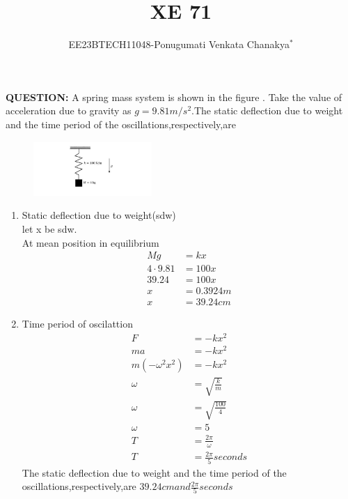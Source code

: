 \documentclass[journal,12pt,twocolumn]{IEEEtran}
\theoremstyle{remark}
\begin{document}
 
 \vspace{3cm}
 \title{\textbf{XE 71}}
 \author{EE23BTECH11048-Ponugumati Venkata Chanakya$^{*}$%
 }
 \maketitle
 \newpage
 \bigskip
 \renewcommand{\thefigure}{\theenumi}
 \renewcommand{\thetable}{\theenumi}
 \textbf{QUESTION:}
 A spring mass system is shown in the figure . Take the value of acceleration  due to gravity as $g=9.81m/s^2$.The static deflection due to weight and the time period of the oscillations,respectively,are\\
 \begin{figure}[h!]
    \centering
    \includegraphics[width=0.4\textwidth]{figs/fig1.jpg}
    \caption{ }
    \label{fig}
\end{figure}

\solution
\begin{enumerate}
    \item Static deflection due to weight(sdw)\\
    let x be sdw.\\
    At mean position in equilibrium\\
    \begin{align}
        Mg&=kx\\
        4\cdot9.81&=100x\\
        39.24&=100x\\
        x&=0.3924m\\
        x&=39.24cm
    \end{align}
     \item Time period of oscilattion\\
     \begin{align}
           F&=-kx^2\\
           ma&=-kx^2\\
           m(-\omega^2 x^2)&=-kx^2\\
           \omega &= \sqrt{\frac{k}{m}}\\
           \omega&=\sqrt{\frac{100}{4}}\\
           \omega&=5\\
           T&=\frac{2\pi}{\omega}\\
           T&=\frac{2\pi}{5}seconds
     \end{align}
    The static deflection due to weight and the time period of the oscillations,respectively,are $39.24cm and \frac{2\pi}{5}seconds$
\end{enumerate}
\end{document}
